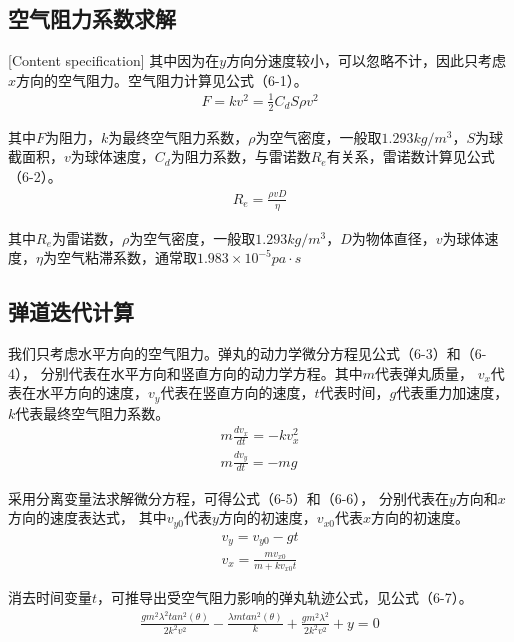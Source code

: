 \subsection{空气阻力系数求解}[Content specification]
其中因为在$y$⽅向分速度较⼩，可以忽略不计，因此只考虑$x$⽅向的空⽓阻⼒。空气阻力计算见公式（6-1）。
\begin{gather}
    F = kv^2 =  \frac{1}{2} C_dS \rho  v^2
\end{gather}

\par

其中$F$为阻力，$k$为最终空气阻力系数，$\rho$为空气密度，一般取$1.293kg/m^3$，$S$为球截面积，$v$为球体速度，$C_d$为阻力系数，与雷诺数$R_e$有关系，雷诺数计算见公式（6-2）。
\begin{gather}
    R_e = \frac{\rho v D}{\eta}
\end{gather}

其中$R_e$为雷诺数，$\rho$为空气密度，一般取$1.293kg/m^3$，$D$为物体直径，$v$为球体速度，$\eta$为空气粘滞系数，通常取$1.983\times10^{-5}pa\cdot s$


\subsection{弹道迭代计算}

我们只考虑水平方向的空气阻力。弹丸的动力学微分方程见公式（6-3）和（6-4），
分别代表在水平方向和竖直方向的动力学方程。其中$m$代表弹丸质量，
$v_x$代表在水平方向的速度，$v_y$代表在竖直方向的速度，$t$代表时间，$g$代表重力加速度，$k$代表最终空气阻力系数。
\begin{gather}
    m \frac{dv_x}{dt} = -k v_x^2 \\
    m \frac{dv_y}{dt} = -mg
\end{gather} 

采用分离变量法求解微分方程，可得公式（6-5）和（6-6），
分别代表在$y$方向和$x$方向的速度表达式，
其中$v_{y0}$代表$y$方向的初速度，$v_{x0}$代表$x$方向的初速度。
\begin{gather}
    v_y = v_{y0}-gt \\
    v_x = \frac{m v_{x0}}{m+kv_{x0}t}
\end{gather}

消去时间变量$t$，可推导出受空气阻力影响的弹丸轨迹公式，见公式（6-7）。
\begin{gather}
\frac{gm^2\lambda^2 tan^2(\theta)}{2k^2v^2}-\frac{\lambda m tan^2(\theta)}{k}+\frac{gm^2\lambda^2}{2k^2v^2}+y = 0
\end{gather}

